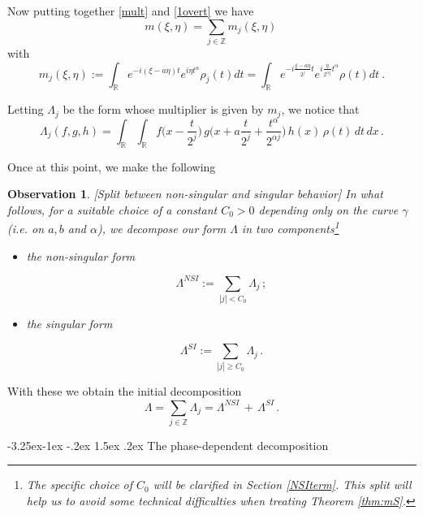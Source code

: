 \documentclass[a4paper,reqno]{amsart}
\makeatletter
\def\subsection{\@startsection{subsection}{2}{\z@}%
	{-3.25ex\@plus -1ex \@minus -.2ex}%
	{1.5ex \@plus .2ex}%
	{\normalfont\bfseries\boldmath}}
\numberwithin{equation}{section}
\newtheorem{observation}[theorem]{Observation}
\theoremstyle{definition}
\newcommand{\R}{\mathbb{R}}
\newcommand{\Z}{\mathbb{Z}}
\def\a{\alpha}
\def\g{\gamma}
\def\L{\Lambda}
\makeatother
\begin{document}
Now putting together \eqref{mult} and  \eqref{1overt} we have
\begin{equation*}
	m(\xi,\eta)=\sum_{j\in\Z} m_j(\xi,\eta)\,
\end{equation*}
with
\begin{equation}\label{rhoj}
	m_j(\xi,\eta):=\int_\R e^{-i(\xi-a\eta) t}e^{i \eta t^\a}\rho_j(t)dt=\int_\R e^{-i\frac{\xi-a\eta}{2^j}  t}e^{i\frac{\eta}{2^{\a j}}t^\a}\rho(t)dt\:.
\end{equation}

Letting $\L_j$ be the form whose multiplier is given by $m_j$, we notice that
\begin{equation}\label{trilinj}
	\L_j(f,g,h)=\int_\R\int_\R f\Big(x-\frac{t}{2^j}\Big)\,g\Big(x+a\frac{t}{2^j}+\frac{t^\a}{2^{\a j}}\Big)\,h(x)\,\rho(t)\,dt\,dx\,.
\end{equation}

Once at this point, we make the following

\begin{observation}\label{trim}[\textsf{Split between non-singular and singular behavior}] In what follows, for a suitable choice of a constant $C_0>0$ depending only on the curve $\g$ (\textit{i.e.} on $a,b$ and $\a$),  we decompose our form $\L$ in two components\footnote{The specific choice of $C_0$ will be clarified in Section \ref{NSIterm}. This split will help us to avoid some technical difficulties when treating Theorem \ref{thm:mS}.}
\begin{itemize}

\item the non-singular form

\begin{equation}\label{nsing}
\L^{NSI}:=\sum_{|j|<C_0} \L_j\,;
\end{equation}

\item the singular form

\begin{equation}\label{sing}
\L^{SI}:=\sum_{|j|\geq C_0} \L_j\,.
\end{equation}
\end{itemize}
\end{observation}

With these we obtain the initial decomposition
\begin{equation}\label{lj}
	\L=\sum_{j\in\Z} \L_j=\L^{NSI}\,+\,\L^{SI}\,.
\end{equation}


\subsection{The phase-dependent decomposition}\label{Phdepdec}
\end{document}
